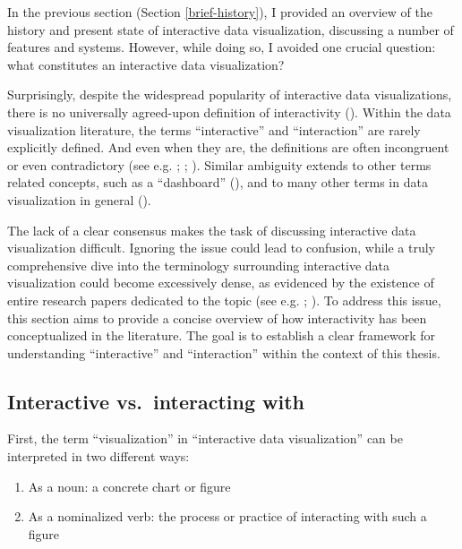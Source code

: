 \documentclass[
  openany]{book}
\providecommand{\tightlist}{%
  \setlength{\itemsep}{0pt}\setlength{\parskip}{0pt}}
\theoremstyle{definition}
\theoremstyle{definition}
\theoremstyle{definition}
\theoremstyle{definition}
\theoremstyle{remark}
\begin{document}
In the previous section (Section \ref{brief-history}), I provided an overview of the history and present state of interactive data visualization, discussing a number of features and systems. However, while doing so, I avoided one crucial question: what constitutes an interactive data visualization?

Surprisingly, despite the widespread popularity of interactive data visualizations, there is no universally agreed-upon definition of interactivity (). Within the data visualization literature, the terms ``interactive'' and ``interaction'' are rarely explicitly defined. And even when they are, the definitions are often incongruent or even contradictory (see e.g. ; ; ). Similar ambiguity extends to other terms related concepts, such as a ``dashboard'' (), and to many other terms in data visualization in general ().

The lack of a clear consensus makes the task of discussing interactive data visualization difficult. Ignoring the issue could lead to confusion, while a truly comprehensive dive into the terminology surrounding interactive data visualization could become excessively dense, as evidenced by the existence of entire research papers dedicated to the topic (see e.g. ; ). To address this issue, this section aims to provide a concise overview of how interactivity has been conceptualized in the literature. The goal is to establish a clear framework for understanding ``interactive'' and ``interaction'' within the context of this thesis.

\subsection{Interactive vs.~interacting with}\label{interactive-interacting}

First, the term ``visualization'' in ``interactive data visualization'' can be interpreted in two different ways:

\begin{enumerate}
\def\labelenumi{\arabic{enumi}.}
\tightlist
\item
  As a noun: a concrete chart or figure
\item
  As a nominalized verb: the process or practice of interacting with such a figure
\end{enumerate}
\end{document}
